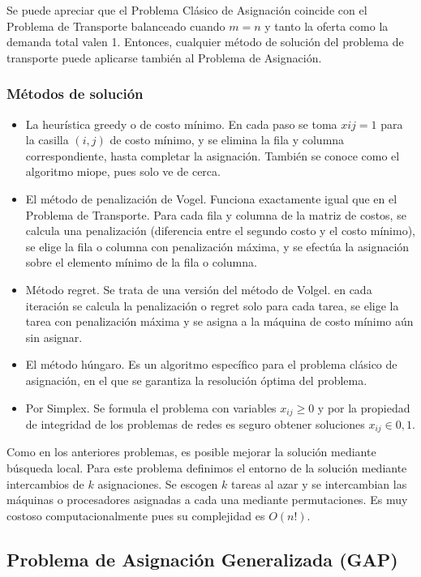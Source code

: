 Se puede apreciar que el Problema Clásico de Asignación coincide con el Problema de Transporte balanceado cuando $m=n$ y tanto
la oferta como la demanda total valen 1. Entonces, cualquier método de solución del problema de transporte puede aplicarse
también al Problema de Asignación.

\subsubsection{Métodos de solución}

\begin{itemize}
    \item La heurística greedy o de costo mínimo. En cada paso se toma $xij=1$ para la casilla $(i,j)$ de costo mínimo, y se
    elimina la ﬁla y columna correspondiente, hasta completar la asignación. También se conoce como el algoritmo miope, pues
    solo ve de cerca.
    \item El método de penalización de Vogel. Funciona exactamente igual que en el Problema de Transporte. Para cada fila y 
    columna de la matriz de costos, se calcula una penalización (diferencia entre el segundo costo y el costo mínimo), se elige
    la fila o columna con penalización máxima, y se efectúa la asignación sobre el elemento mínimo de la fila o columna. 
    \item Método regret. Se trata de una versión del método de Volgel. en cada iteración se calcula la penalización o regret 
    solo para cada tarea, se elige la tarea con penalización máxima y se asigna a la máquina de costo mínimo aún sin asignar.
    \item El método húngaro. Es un algoritmo específico para el problema clásico de asignación, en el que se garantiza la 
    resolución óptima del problema.
    \item Por Simplex. Se formula el problema con variables $x_{ij}\geq 0$ y por la propiedad de integridad de los problemas de
    redes es seguro obtener soluciones $x_{ij}\in {0,1}$.
\end{itemize}

Como en los anteriores problemas, es posible mejorar la solución mediante búsqueda local. Para este problema definimos el 
entorno de la solución mediante intercambios de $k$ asignaciones. Se escogen $k$ tareas al azar y se intercambian las 
máquinas o procesadores asignadas a cada una mediante permutaciones. Es muy costoso computacionalmente pues su complejidad
es $O(n!)$.

\subsection{Problema de Asignación Generalizada (GAP)}

